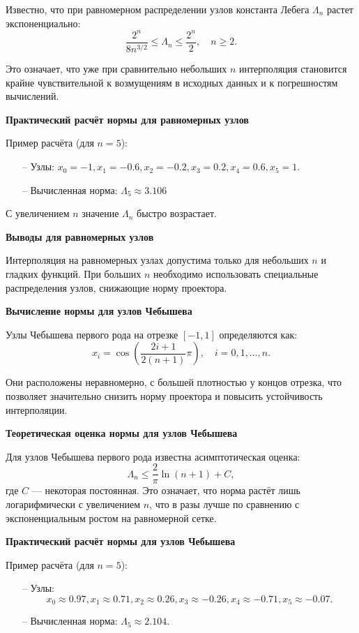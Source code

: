 \documentclass[14pt,openany,a4paper,oneside]{extarticle}
\begin{document}
	Известно, что при равномерном распределении узлов константа Лебега $\Lambda_n$ растет экспоненциально: $$\frac{2^n}{8n^{3/2}} \leq \Lambda_n \leq \frac{2^n}{2}, \quad n\geq2.$$
	
	Это означает, что уже при сравнительно небольших $n$ интерполяция становится крайне чувствительной к возмущениям в исходных данных и к погрешностям вычислений.
	
	\textbf{Практический расчёт нормы для равномерных узлов}
	
	Пример расчёта (для $n=5$):
	\begin{enumerate}
		\item[--] Узлы: $x_0=-1, x_1=-0.6, x_2=-0.2, x_3=0.2, x_4=0.6, x_5=1.$
		\item[--] Вычисленная норма: $\Lambda_5 \approx 3.106$
	\end{enumerate}
	
	С увеличением $n$ значение $\Lambda_n$ быстро возрастает.
	
	\textbf{Выводы для равномерных узлов}
	
	Интерполяция на равномерных узлах допустима только для небольших $n$ и гладких функций. При больших $n$ необходимо использовать специальные распределения узлов, снижающие норму проектора.
	
	\textbf{Вычисление нормы для узлов Чебышева}
	
	Узлы Чебышева первого рода на отрезке $[-1,1]$ определяются как:
	$$x_i=\cos(\frac{2i+1}{2(n+1)}\pi), \quad i=0,1,\dots,n.$$
	
	Они расположены неравномерно, с большей плотностью у концов отрезка, что позволяет значительно снизить норму проектора и повысить устойчивость интерполяции.
	
	\textbf{Теоретическая оценка нормы для узлов Чебышева}
	
	Для узлов Чебышева первого рода известна асимптотическая оценка:
	$$\Lambda_n\leq\frac{2}{\pi}\ln(n+1)+C,$$
	где $C$ — некоторая постоянная. Это означает, что норма растёт лишь логарифмически с увеличением $n$, что в разы лучше по сравнению с экспоненциальным ростом на равномерной сетке.
	
	\textbf{Практический расчёт нормы для узлов Чебышева}
	
	Пример расчёта (для $n=5$):
	\begin{enumerate}
		\item[--] Узлы: $$x_0\approx0.97,x_1\approx0.71,x_2\approx0.26,x_3\approx-0.26,x_4\approx-0.71, x_5\approx-0.07.$$
		\item[--] Вычисленная норма: $\Lambda_5\approx2.104.$
	\end{enumerate}
	
\end{document}
